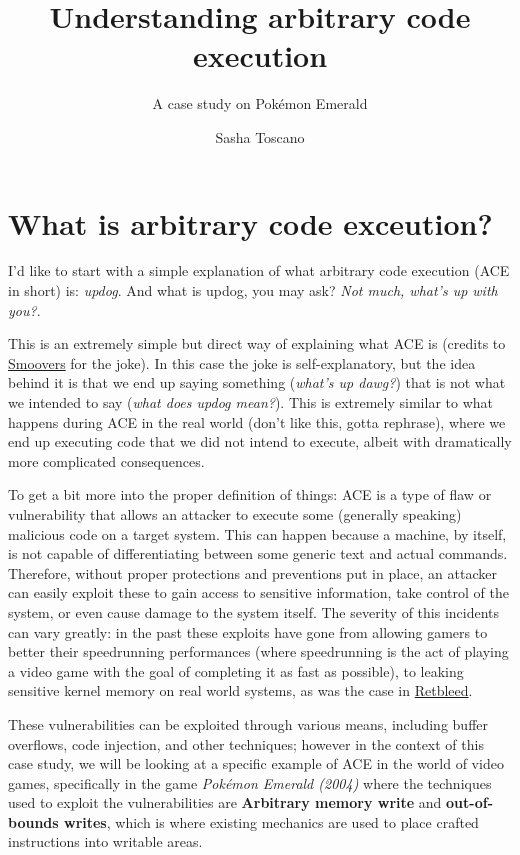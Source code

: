 \documentclass[a4paper]{usiinfbachelorproject}
\author{Sasha Toscano}
\title{\textbf{Understanding arbitrary code
execution}}
\subtitle{A case study on Pokémon Emerald}
\begin{document}
\maketitle
\tableofcontents\newpage

\section{\textbf{What is arbitrary code exceution?}}
I'd like to start with a simple explanation of what arbitrary code execution (ACE in short) is: \textit{updog}. And what is updog, you may ask? \textit{Not much, what's up with you?}.

This is an extremely simple but direct way of explaining what ACE is (credits to \href{https://www.youtube.com/watch?v=-XmXYCXX7y4}{Smoovers} for the joke). In this case the joke is self-explanatory, but the idea behind it is that we end up saying something (\textit{what's up dawg?}) that is not what we intended to say (\textit{what does updog mean?}). This is extremely similar to what happens during ACE in the real world (don't like this, gotta rephrase), where we end up executing code that we did not intend to execute, albeit with dramatically more complicated consequences.

To get a bit more into the proper definition of things: ACE is a type of flaw or vulnerability that allows an attacker to execute some (generally speaking) malicious code on a target system. This can happen because a machine, by itself, is not capable of differentiating between some generic text and actual commands. Therefore, without proper protections and preventions put in place, an attacker can easily exploit these to gain access to sensitive information, take control of the system, or even cause damage to the system itself. The severity of this incidents can vary greatly: in the past these exploits have gone from allowing gamers to better their speedrunning performances (where speedrunning is the act of playing a video game with the goal of completing it as fast as possible), to leaking sensitive kernel memory on real world systems, as was the case in \href{https://comsec.ethz.ch/research/microarch/retbleed/}{Retbleed}.

These vulnerabilities can be exploited through various means, including buffer overflows, code injection, and other techniques; however in the context of this case study, we will be looking at a specific example of ACE in the world of video games, specifically in the game \textit{Pokémon Emerald (2004)} where the techniques used to exploit the vulnerabilities are \textbf{Arbitrary memory write} and \textbf{out-of-bounds writes}, which is where existing mechanics are used to place crafted instructions into writable areas.
\end{document}
